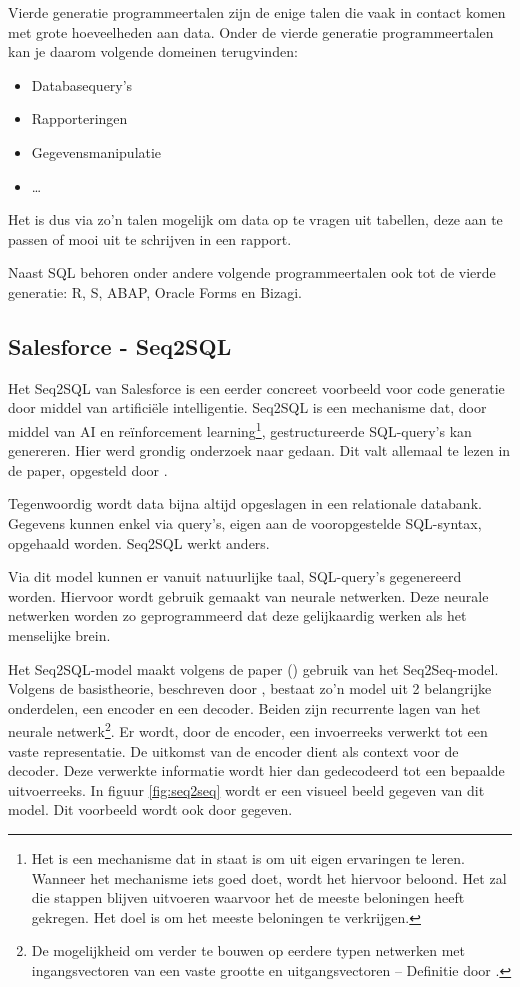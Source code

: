 Vierde generatie programmeertalen zijn de enige talen die vaak in contact komen met grote hoeveelheden aan data. Onder de vierde generatie programmeertalen kan je daarom volgende domeinen terugvinden:
\begin{itemize}
	\item Databasequery’s
	\item Rapporteringen
	\item Gegevensmanipulatie
	\item \dots
\end{itemize}

Het is dus via zo’n talen mogelijk om data op te vragen uit tabellen, deze aan te passen of mooi uit te schrijven in een rapport.

Naast SQL behoren onder andere volgende programmeertalen ook tot de vierde generatie: R, S, ABAP, Oracle Forms en Bizagi.

\subsection{Salesforce - Seq2SQL}
\label{sec:Salesforce - Seq2SQL}

Het Seq2SQL van Salesforce is een eerder concreet voorbeeld voor code generatie door middel van artificiële intelligentie. Seq2SQL is een mechanisme dat, door middel van AI en reïnforcement learning\footnote{Het is een mechanisme dat in staat is om uit eigen ervaringen te leren. Wanneer het mechanisme iets goed doet, wordt het hiervoor beloond. Het zal die stappen blijven uitvoeren waarvoor het de meeste beloningen heeft gekregen. Het doel is om het meeste beloningen te verkrijgen.}, gestructureerde SQL-query’s kan genereren. Hier werd grondig onderzoek naar gedaan. Dit valt allemaal te lezen in de paper, opgesteld door \textcite{seq2sqlPaper}.

Tegenwoordig wordt data bijna altijd opgeslagen in een relationale databank. Gegevens kunnen enkel via query’s, eigen aan de vooropgestelde SQL-syntax, opgehaald worden. Seq2SQL werkt anders.

Via dit model kunnen er vanuit natuurlijke taal, SQL-query’s gegenereerd worden. Hiervoor wordt gebruik gemaakt van neurale netwerken. Deze neurale netwerken worden zo geprogrammeerd dat deze gelijkaardig werken als het menselijke brein. 

Het Seq2SQL-model maakt volgens de paper (\textcite{seq2sqlPaper}) gebruik van het Seq2Seq-model. Volgens de basistheorie, beschreven door \textcite{drnn}, bestaat zo’n model uit 2 belangrijke onderdelen, een encoder en een decoder. Beiden zijn recurrente lagen van het neurale netwerk\footnote{De mogelijkheid om verder te bouwen op eerdere typen netwerken met ingangsvectoren van een vaste grootte en uitgangsvectoren – Definitie door \textcite{rnn}.}. Er wordt, door de encoder, een invoerreeks verwerkt tot een vaste representatie. De uitkomst van de encoder dient als context voor de decoder. Deze verwerkte informatie wordt hier dan gedecodeerd tot een bepaalde uitvoerreeks. In figuur \ref{fig:seq2seq} wordt er een visueel beeld gegeven van dit model. Dit voorbeeld wordt ook door \textcite{drnn} gegeven.

